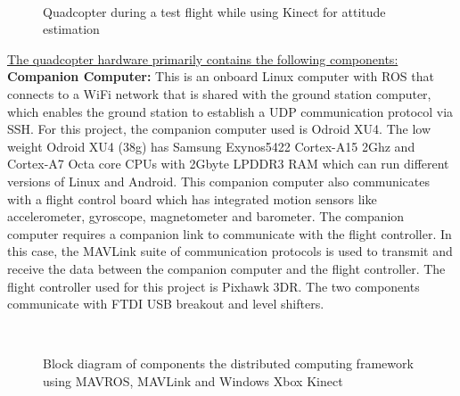 \documentclass[letterpaper%
, twoside%
, 12pt%
,memoire%
, english%
,creativecommons,hyperref%
]{thETS}
\begin{document}
\begin{figure}
	\centering
	 \\ \parbox{0.75\textwidth}{\caption{Quadcopter during a test flight while using Kinect for attitude estimation\label{Fig:quad_flying}}}
\end{figure}

\underline{The quadcopter hardware primarily contains the following components:}\\
\textbf{Companion Computer:} This is an onboard Linux computer with ROS that connects to a WiFi network that is shared with the ground station computer, which enables the ground station to establish a UDP communication protocol via SSH. For this project, the companion computer used is Odroid XU4. The low weight Odroid XU4 (38g) has Samsung Exynos5422 Cortex-A15 2Ghz and Cortex-A7 Octa core CPUs with 2Gbyte LPDDR3 RAM which can run different versions of Linux and Android. This companion computer also communicates with a flight control board which has integrated motion sensors like accelerometer, gyroscope, magnetometer and barometer. The companion computer requires a companion link to communicate with the flight controller. In this case, the MAVLink suite of communication protocols is used to transmit and receive the data between the companion computer and the flight controller. The flight controller used for this project is Pixhawk 3DR. The two components communicate with FTDI USB breakout and level shifters. 


\begin{figure}[H]
	\centering
	\resizebox{0.75\textwidth}{!}{\fbox{}}
	 \\ \parbox{0.75\textwidth}{\caption{Block diagram of components the distributed computing framework using MAVROS, MAVLink and Windows Xbox Kinect \label{Fig:distributed}}}
\end{figure}
\end{document}
